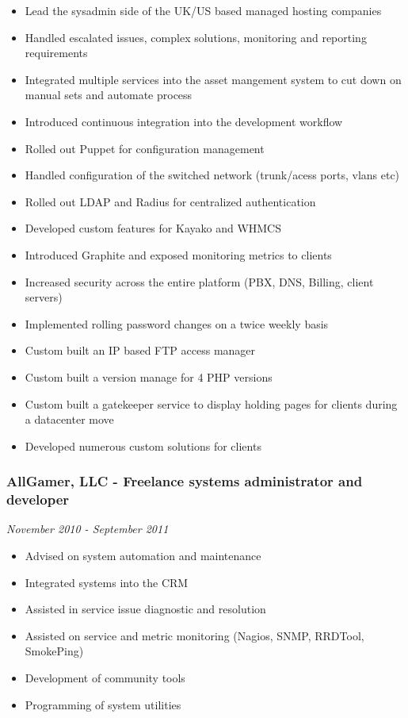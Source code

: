 \begin{itemize}
\item
  Lead the sysadmin side of the UK/US based managed hosting companies
\item
  Handled escalated issues, complex solutions, monitoring and reporting
  requirements
\item
  Integrated multiple services into the asset mangement system to cut
  down on manual sets and automate process
\item
  Introduced continuous integration into the development workflow
\item
  Rolled out Puppet for configuration management
\item
  Handled configuration of the switched network (trunk/acess ports,
  vlans etc)
\item
  Rolled out LDAP and Radius for centralized authentication
\item
  Developed custom features for Kayako and WHMCS
\item
  Introduced Graphite and exposed monitoring metrics to clients
\item
  Increased security across the entire platform (PBX, DNS, Billing,
  client servers)
\item
  Implemented rolling password changes on a twice weekly basis
\item
  Custom built an IP based FTP access manager
\item
  Custom built a version manage for 4 PHP versions
\item
  Custom built a gatekeeper service to display holding pages for clients
  during a datacenter move
\item
  Developed numerous custom solutions for clients
\end{itemize}
\subsubsection{AllGamer, LLC - Freelance systems administrator and
developer}

\emph{November 2010 - September 2011}

\begin{itemize}
\item
  Advised on system automation and maintenance
\item
  Integrated systems into the CRM
\item
  Assisted in service issue diagnostic and resolution
\item
  Assisted on service and metric monitoring (Nagios, SNMP, RRDTool,
  SmokePing)
\item
  Development of community tools
\item
  Programming of system utilities
\end{itemize}
